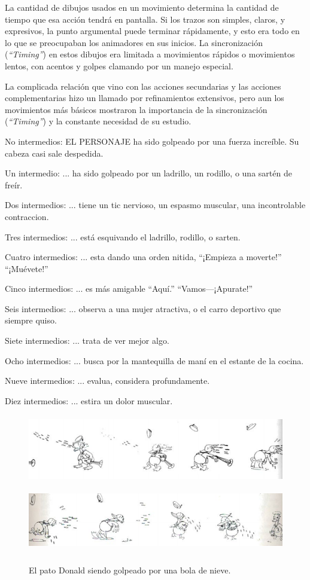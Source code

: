 \documentclass[a4paper,12pt]{report}
\begin{document}
 
La cantidad de dibujos usados en un movimiento determina la cantidad de tiempo que esa acción tendrá en pantalla.
Si los trazos son simples, claros, y expresivos, la punto argumental puede terminar rápidamente, y esto era todo en lo que se preocupaban los animadores en sus inicios.
La sincronización (\textit{``Timing''}) en estos dibujos era limitada a movimientos rápidos o movimientos lentos, con acentos y golpes clamando por un manejo especial.\cite{principles_animation}
 
 
La complicada relación que vino con las acciones secundarias y las acciones complementarias hizo un llamado por refinamientos extensivos, pero aun los movimientos más básicos
mostraron la importancia de la sincronización (\textit{``Timing''}) y la constante necesidad de su estudio.
 
 
No intermedios: EL PERSONAJE ha sido golpeado por una fuerza increíble. Su cabeza casi sale despedida.
 
 
Un intermedio: ... ha sido golpeado por un ladrillo, un rodillo, o una sartén de freír.
 
 
Dos intermedios: ... tiene un tic nervioso, un espasmo muscular, una incontrolable contraccion.
 
 
Tres intermedios: ... está esquivando el ladrillo, rodillo, o sarten.
 
 
Cuatro intermedios: ... esta dando una orden nitida, ``¡Empieza a moverte!'' ``¡Muévete!''
 
 
Cinco intermedios: ... es más amigable ``Aquí.'' ``Vamos---¡Apurate!''
 
 
Seis intermedios: ... observa a una mujer atractiva, o el carro deportivo que siempre quiso.
 
 
Siete intermedios: ... trata de ver mejor algo.
 
 
Ocho intermedios: ... busca por la mantequilla de maní en el estante de la cocina.
 
 
Nueve intermedios: ... evalua, considera profundamente.
 
 
Diez intermedios: ... estira un dolor muscular.\cite{principles_animation}
 
 
\begin{figure}[ht]
    \centering
    \includegraphics[height=3cm]{Imagenes/timming1}
    \includegraphics[height=3cm]{Imagenes/timming2}
    \caption{El pato Donald siendo golpeado por una bola de nieve.}
    \label{fig:timming1}
\end{figure}
 
\end{document}
